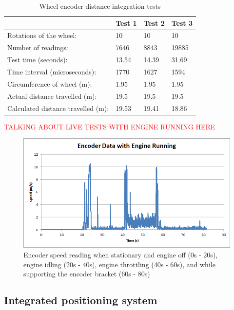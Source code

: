 \documentclass[main.tex]{subfiles}
\begin{document}
\begin{table}[ht]
\centering
\caption{Wheel encoder distance integration tests}
\begin{tabular}{l|l|l|l}
                                   & Test 1 & Test 2 & Test 3 \\ \hline
Rotations of the wheel:            & 10     & 10     & 10     \\
Number of readings:                & 7646   & 8843   & 19885  \\
Test time (seconds):               & 13.54  & 14.39  & 31.69  \\
Time interval (microseconds):      & 1770   & 1627   & 1594   \\
Circumference of wheel (m):        & 1.95   & 1.95   & 1.95   \\
Actual distance travelled (m):     & 19.5   & 19.5   & 19.5   \\
Calculated distance travelled (m): & 19.53  & 19.41  & 18.86  \\
\end{tabular}
\end{table}

\textcolor{red}{TALKING ABOUT LIVE TESTS WITH ENGINE RUNNING HERE}

\begin{figure}[ht]
\includegraphics[width=1\textwidth]{5-Testing/Encoder_data_with_engine_running.png}
\centering
\caption{Encoder speed reading when stationary and engine off (0s - 20s), engine idling (20s - 40s), engine throttling (40s - 60s), and while supporting the encoder bracket (60s - 80s)}
\end{figure}

\subsection{Integrated positioning system}
\end{document}
